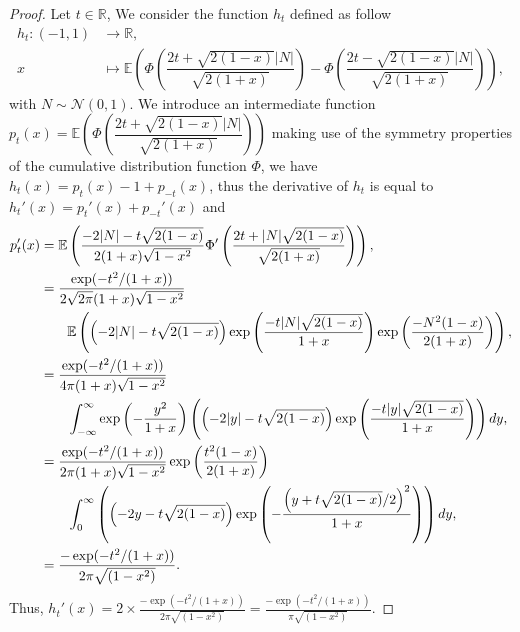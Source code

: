 \documentclass[12pt]{article}
\theoremstyle{Theorem}
\theoremstyle{definition}
\begin{document}
\begin{proof}
Let $t \in \mathbb{R}$, We consider the function $h_{t}$ defined as follow \begin{align*} 
h_{t}: (-1,1) &\longrightarrow \mathbb{R}, \\
x & \longmapsto \mathbb{E}\left(\Phi\left(\dfrac{2t + \sqrt{2(1-x)}|N|}{\sqrt{2(1+x)}}\right) - \Phi\left(\dfrac{2t - \sqrt{2(1-x)}|N|}{\sqrt{2(1+x)}}\right)\right),
\end{align*}
with $N \sim \mathcal{N}\left(0,1\right)$. We introduce an intermediate function $p_{t}(x) = \mathbb{E}\left(\Phi\left(\dfrac{2t + \sqrt{2(1-x)}|N|}{\sqrt{2(1+x)}}\right)\right)$ making use of the symmetry properties of the cumulative distribution function $\Phi$, \linebreak we have $h_{t}(x) =p_{t}(x) - 1 + p_{-t}(x)$, thus the derivative of $h_{t}$ is equal to $h_{t}'(x) = p_{t}'(x) + p_{-t}'(x)$ and 
\begin{align*}p_{t}'(x) & = \mathbb{E}\left(\frac{-2|N| -t\sqrt{2(1-x)}}{2(1+x)\sqrt{1-x^2}}\Phi'\left(\frac{2t + |N|\sqrt{2(1-x)}}{\sqrt{2(1+x)}}\right)\right), \\
& = \frac{\exp(-t^2/(1+x))}{2\sqrt{2\pi}(1+x)\sqrt{1-x^2}}\\
& \hspace{0.7cm}\mathbb{E}\left(\left(-2|N| -t\sqrt{2(1-x)}\right)\exp\left(\frac{-t|N|\sqrt{2(1-x)}}{1+x}\right)\exp\left(\frac{-N^{2}(1-x)}{2(1+x)}\right)\right), \\
& = \frac{\exp(-t^2/(1+x))}{4\pi(1+x)\sqrt{1-x^2}} \\
& \hspace{0.7cm} \int_{-\infty}^{\infty}\exp\left(-\frac{y^2}{1+x}\right)\left(\left(-2|y| -t\sqrt{2(1-x)}\right)\exp\left(\frac{-t|y|\sqrt{2(1-x)}}{1+x}\right)\right)dy,\\
& = \frac{\exp(-t^2/(1+x))}{2\pi(1+x)\sqrt{1-x^2}}\exp\left(\frac{t^2(1-x)}{2(1+x)}\right) \\
& \hspace{0.7cm} \int_{0}^{\infty}\left(\left(-2y -t\sqrt{2(1-x)}\right)\exp\left(-\frac{\left(y+t\sqrt{2(1-x)}/2\right)^{2}}{1+x}\right)\right)dy,  \\
& = \frac{-\exp(-t^2/(1+x))}{2\pi\sqrt{(1-x^2)}}.
\end{align*}Thus, $h_{t}'(x) = 2 \times \frac{-\exp(-t^2/(1+x))}{2\pi\sqrt{(1-x^2)}} = \frac{-\exp(-t^2/(1+x))}{\pi\sqrt{(1-x^2)}}$.

\end{proof}
\end{document}

